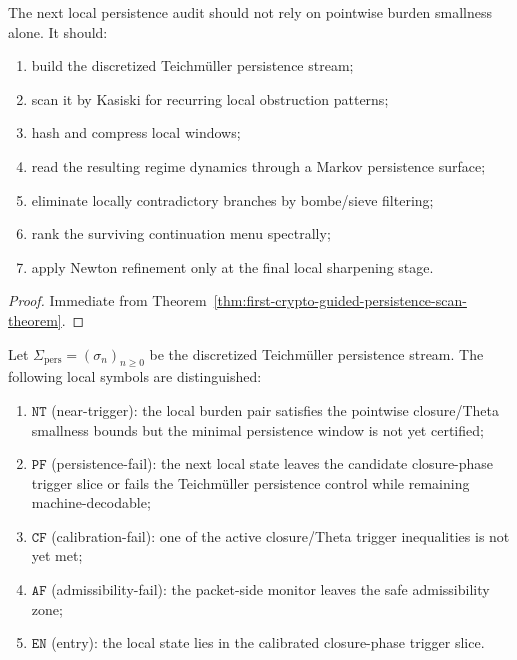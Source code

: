 \begin{corollary}
\label{cor:current-post-r16-persistence-working-rule}
The next local persistence audit should not rely on pointwise burden smallness alone.
It should:
\begin{enumerate}
    \item build the discretized Teichm\"uller persistence stream;
    \item scan it by Kasiski for recurring local obstruction patterns;
    \item hash and compress local windows;
    \item read the resulting regime dynamics through a Markov persistence surface;
    \item eliminate locally contradictory branches by bombe/sieve filtering;
    \item rank the surviving continuation menu spectrally;
    \item apply Newton refinement only at the final local sharpening stage.
\end{enumerate}
\end{corollary}

\begin{proof}
Immediate from Theorem~\ref{thm:first-crypto-guided-persistence-scan-theorem}.
\end{proof}



\begin{definition}
\label{def:local-persistence-symbols}
Let \(\Sigma_{\mathrm{pers}}=(\sigma_n)_{n\ge 0}\) be the discretized Teichm\"uller persistence stream.
The following local symbols are distinguished:
\begin{enumerate}
    \item \(\mathtt{NT}\) (near-trigger): the local burden pair satisfies the pointwise closure/Theta smallness bounds but the minimal persistence window is not yet certified;
    \item \(\mathtt{PF}\) (persistence-fail): the next local state leaves the candidate closure-phase trigger slice or fails the Teichm\"uller persistence control while remaining machine-decodable;
    \item \(\mathtt{CF}\) (calibration-fail): one of the active closure/Theta trigger inequalities is not yet met;
    \item \(\mathtt{AF}\) (admissibility-fail): the packet-side monitor leaves the safe admissibility zone;
    \item \(\mathtt{EN}\) (entry): the local state lies in the calibrated closure-phase trigger slice.
\end{enumerate}
\end{definition}

